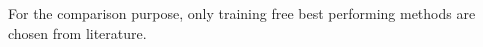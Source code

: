 \documentclass[runningheads]{llncs}
\begin{document}
\begin{table}[bht!]
\begin{threeparttable}
\begin{tabular}{ P{1.4cm} P{1.2cm} P{1.8cm} P{1.8cm} P{1.2cm} P{1.4cm} }
			
			
			
		\end{tabular}
		\begin{tablenotes}
			\small
			\item * For the comparison purpose, only training free best performing methods are chosen from literature.  
		\end{tablenotes}
	\end{threeparttable}
\end{table}
\end{document}
